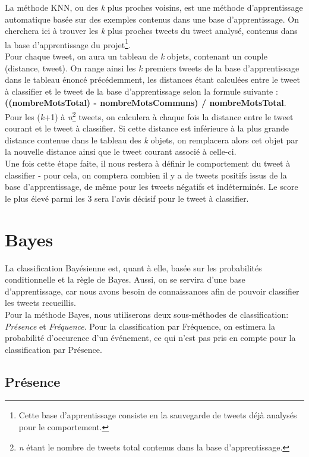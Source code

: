 \documentclass[pdftex,12pt,a4paper]{report}
\begin{document}
\begin{spacing}{1.2}
La méthode KNN, ou des \textit{k} plus proches voisins, est une méthode d'apprentissage automatique basée sur des exemples contenus dans une base d'apprentissage.
On cherchera ici à trouver les \textit{k} plus proches tweets du tweet analysé, contenus dans la base d'apprentissage du projet\footnote{Cette base d'apprentissage consiste en la sauvegarde de tweets déjà analysés pour le comportement.}.
\\
Pour chaque tweet, on aura un tableau de \textit{k} objets, contenant un couple (distance, tweet). On range ainsi les \textit{k} premiers tweets de la base d'apprentissage dans le tableau énoncé précédemment, les distances étant calculées entre le tweet à classifier et le tweet de la base d'apprentissage selon la formule suivante : \textbf{((nombreMotsTotal) - nombreMotsCommuns) / nombreMotsTotal}.
Pour les (\textit{k}+1) à \textit{n}\footnote{\textit{n} étant le nombre de tweets total contenus dans la base d'apprentissage.} tweets, on calculera à chaque fois la distance entre le tweet courant et le tweet à classifier. Si cette distance est inférieure à la plus grande distance contenue dans le tableau des \textit{k} objets, on remplacera alors cet objet par la nouvelle distance ainsi que le tweet courant associé à celle-ci.
\\
Une fois cette étape faite, il nous restera à définir le comportement du tweet à classifier - pour cela, on comptera combien il y a de tweets positifs issus de la base d'apprentissage, de même pour les tweets négatifs et indéterminés. Le score le plus élevé parmi les 3 sera l'avis décisif pour le tweet à classifier.

\section{Bayes}

La classification Bayésienne est, quant à elle, basée sur les probabilités conditionnelle et la règle de Bayes. Aussi, on se servira d'une base d'apprentissage, car nous avons besoin de connaissances afin de pouvoir classifier les tweets recueillis.\\
Pour la méthode Bayes, nous utiliserons deux sous-méthodes de classification: \textit{Présence} et \textit{Fréquence}. Pour la classification par Fréquence, on estimera la probabilité d'occurence d'un événement, ce qui n'est pas pris en compte pour la classification par Présence.

\subsection{Présence}


\end{spacing}
\end{document}
